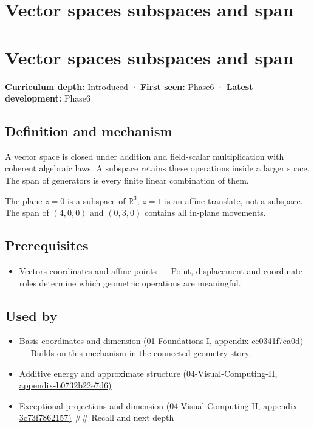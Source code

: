 \hypertarget{appendix-173b52c063ae}{}
\section*{Vector spaces subspaces and span}
\section{Vector spaces subspaces and span}\label{appendix-173b52c063ae-vector-spaces-subspaces-and-span}

\textbf{Curriculum depth:} Introduced · \textbf{First seen:} Phase6 · \textbf{Latest development:} Phase6

\subsection{Definition and mechanism}\label{appendix-173b52c063ae-definition-and-mechanism}

A vector space is closed under addition and field-scalar multiplication with coherent algebraic laws. A subspace retains these operations inside a larger space. The span of generators is every finite linear combination of them.

The plane \(z=0\) is a subspace of \(\mathbb R^3\); \(z=1\) is an affine translate, not a subspace. The span of \((4,0,0)\) and \((0,3,0)\) contains all in-plane movements.

\subsection{Prerequisites}\label{appendix-173b52c063ae-prerequisites}

\begin{itemize}
\tightlist
\item
  \hyperref[appendix-0659864c0aa3]{Vectors coordinates and affine points} --- Point, displacement and coordinate roles determine which geometric operations are meaningful.
\end{itemize}

\subsection{Used by}\label{appendix-173b52c063ae-used-by}

\begin{itemize}
\item
  \href{../01-Foundations-I/main.pdf\#nameddest=appendix-ce0341f7ea0d}{Basis coordinates and dimension (01-Foundations-I, appendix-ce0341f7ea0d)} --- Builds on this mechanism in the connected geometry story.
\item
  \href{../04-Visual-Computing-II/main.pdf\#nameddest=appendix-b0732b22e7d6}{Additive energy and approximate structure (04-Visual-Computing-II, appendix-b0732b22e7d6)}
\item
  \href{../04-Visual-Computing-II/main.pdf\#nameddest=appendix-3c73f7862157}{Exceptional projections and dimension (04-Visual-Computing-II, appendix-3c73f7862157)} \#\# Recall and next depth
\end{itemize}

